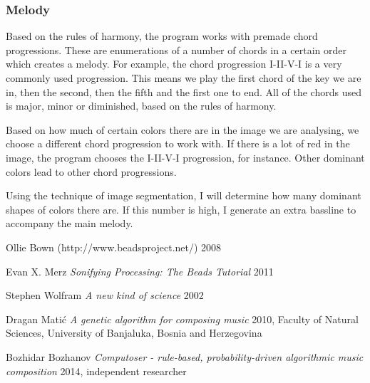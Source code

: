 \documentclass[12pt]{article}
\begin{document}
\subsubsection{Melody}

Based on the rules of harmony, the program works with premade chord progressions. These are enumerations of a number of chords in a certain order which creates a melody. For example, the chord progression I-II-V-I is a very commonly used progression. This means we play the first chord of the key we are in, then the second, then the fifth and the first one to end. All of the chords used is major, minor or diminished, based on the rules of harmony.
\newline

Based on how much of certain colors there are in the image we are analysing, we choose a different chord progression to work with. If there is a lot of red in the image, the program chooses the I-II-V-I progression, for instance. Other dominant colors lead to other chord progressions.
\newline

Using the technique of image segmentation, I will determine how many dominant shapes of colors there are. If this number is high, I generate an extra bassline to accompany the main melody. 

\begin{thebibliography}{1}

 Ollie Bown (http://www.beadsproject.net/) 2008

 Evan X. Merz {\em Sonifying Processing: The Beads Tutorial} 2011

 Stephen Wolfram {\em A new kind of science} 2002

 Dragan Mati\'c {\em A genetic algorithm for composing music} 2010, Faculty of Natural Sciences, University of Banjaluka, Bosnia and Herzegovina

 Bozhidar Bozhanov {\em Computoser - rule-based, probability-driven algorithmic music composition} 2014,  independent researcher

\end{thebibliography}
\end{document}
